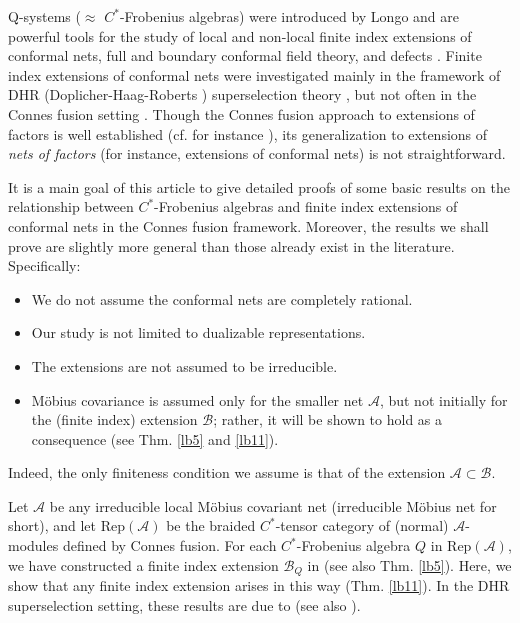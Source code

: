 \documentclass[11pt,b5paper,notitlepage]{article}
\theoremstyle{definition}
\theoremstyle{plain}
\newcommand{\mc}{\mathcal}
\newcommand{\RepA}{\mathrm{Rep}(\mathcal A)}
\numberwithin{equation}{section}
\begin{document}
Q-systems ($\approx$ $C^*$-Frobenius algebras) were introduced by Longo \cite{Lon94} and are powerful tools for the study of local and non-local finite index extensions of conformal nets, full and boundary conformal field theory, and defects \cite{LR95,KL04,KLPR07,LR04,LR09,CKL13,BKL15,BKLR15,BKLR16,BDH19}. Finite index extensions of conformal nets were investigated mainly  in the framework of DHR (Doplicher-Haag-Roberts \cite{DHR71,DHR74}) superselection theory \cite{FRS89,FRS92},  but not often in the Connes fusion setting \cite{Con80,Sau83,Was98,BDH17}. Though the Connes fusion approach  to extensions of factors is well established (cf. for instance \cite{Mas97,Yuan19,GY20,CHPJP21}), its generalization to extensions of \textit{nets of factors} (for instance, extensions of conformal nets) is not straightforward.   

It is a main goal of this article to give detailed proofs  of some basic results on the relationship between $C^*$-Frobenius algebras and finite index extensions of conformal nets in the Connes fusion framework.   Moreover, the results we shall prove are slightly more general than those already exist in the literature. Specifically:
\begin{itemize}
\item We do not assume the conformal nets are completely rational.
\item Our study is not limited to dualizable representations.
\item The extensions are not assumed to be irreducible.
\item M\"obius covariance is assumed only for the smaller net $\mc A$, but not initially for the (finite index) extension $\mc B$; rather, it will be shown to hold as a consequence (see Thm. \ref{lb5} and \ref{lb11}).
\end{itemize}
Indeed, the only finiteness condition we assume is that of the extension $\mc A\subset\mc B$.


Let $\mc A$ be any irreducible local M\"obius covariant net (irreducible M\"obius net for short), and let $\RepA$ be the braided $C^*$-tensor category of (normal) $\mc A$-modules defined by Connes fusion. For each $C^*$-Frobenius algebra $Q$ in $\RepA$, we have constructed a finite index extension $\mc B_Q$ in \cite{Gui21b} (see also Thm. \ref{lb5}). Here, we show that any finite index extension arises in this way	(Thm. \ref{lb11}).  In the DHR superselection setting, these results are due to  \cite[Thm. 4.9]{LR95} (see also \cite[Sec. 5.2]{BKLR15}).
\end{document}
